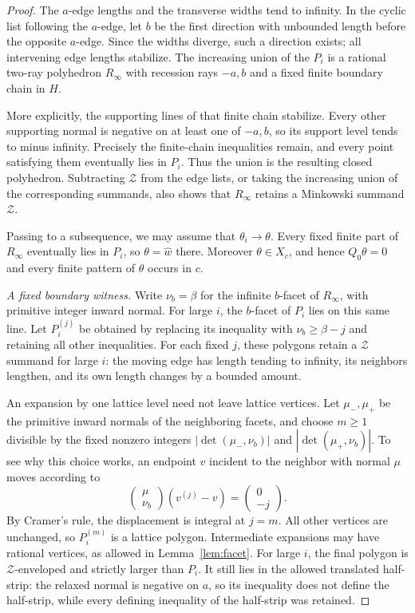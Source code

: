 \documentclass[11pt]{article}
\numberwithin{equation}{section}
\theoremstyle{definition}
\theoremstyle{remark}
\newcommand{\ZZ}{\mathcal Z}
\begin{document}
\begin{proof}
The $a$-edge lengths and the transverse widths tend to infinity. In the cyclic list following the
$a$-edge, let $b$ be the first direction with unbounded length before the opposite $a$-edge. Since the widths diverge, such a
direction exists; all intervening edge lengths stabilize. The increasing
union of the $P_i$ is a rational two-ray polyhedron $R_\infty$ with recession rays $-a,b$ and a
fixed finite boundary chain in $H$.

More explicitly, the supporting lines of that finite chain stabilize. Every other supporting normal
is negative on at least one of $-a,b$, so its support level tends to minus infinity. Precisely the
finite-chain inequalities remain, and every point satisfying them eventually lies in $P_i$. Thus the
union is the resulting closed polyhedron. Subtracting $\ZZ$ from the edge lists, or taking the
increasing union of the corresponding summands, also shows that $R_\infty$ retains a Minkowski
summand $\ZZ$.

Passing to a subsequence, we may assume that $\theta_i\to\theta$. Every fixed finite part of $R_\infty$
eventually lies in $P_i$, so $\theta=\widehat w$ there. Moreover $\theta\in X_c$, and hence
$Q_0\theta=0$ and every finite pattern of $\theta$ occurs in $c$.

\smallskip\noindent
\emph{A fixed boundary witness.} Write $\nu_b=\beta$ for the infinite $b$-facet of $R_\infty$, with primitive integer inward normal. For large $i$, the $b$-facet of $P_i$ lies on this same line. Let $P_i^{(j)}$ be obtained by replacing its inequality with $\nu_b\ge\beta-j$ and retaining all other inequalities. For each fixed $j$, these polygons retain a $\ZZ$ summand for large $i$: the moving edge has length tending to infinity, its neighbors lengthen, and its own length changes by a bounded amount.

An expansion by one lattice level need not leave lattice vertices. Let $\mu_-,\mu_+$ be the
primitive inward normals of the neighboring facets, and choose $m\ge1$ divisible by the fixed
nonzero integers $|\det(\mu_-,\nu_b)|$ and $|\det(\mu_+,\nu_b)|$. To see why this choice works,
an endpoint $v$ incident to the neighbor with normal $\mu$ moves according to
\[
 \begin{pmatrix}\mu\\ \nu_b\end{pmatrix}
 (v^{(j)}-v)=\begin{pmatrix}0\\-j\end{pmatrix}.
\]
By Cramer's rule, the displacement is integral at $j=m$. All other vertices are unchanged, so
$P_i^{(m)}$ is a lattice polygon. Intermediate expansions may have rational vertices, as allowed in
Lemma~\ref{lem:facet}. For large $i$, the final polygon is $\ZZ$-enveloped and strictly larger than
$P_i$. It still lies in the allowed translated half-strip: the relaxed normal is negative on $a$, so
its inequality does not define the half-strip, while every defining inequality of the half-strip was
retained.


\end{proof}
\end{document}
